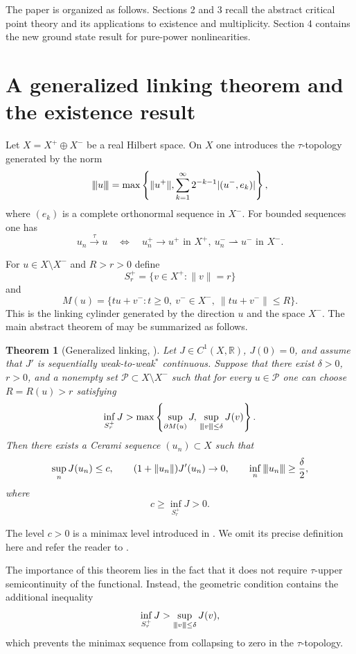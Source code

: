 \documentclass[10pt,a4paper]{amsart}
\numberwithin{equation}{section}
\newtheorem{theorem}{Theorem}[section]
\newcommand{\R}{\mathbb{R}}
\newcommand{\cP}{\mathcal{P}}
\newcommand{\weak}{\rightharpoonup}
\newcommand{\vertiii}[1]{{\left\vert\kern-0.25ex\left\vert\kern-0.25ex\left\vert #1 \right\vert\kern-0.25ex\right\vert\kern-0.25ex\right\vert}}
\begin{document}
The paper is organized as follows. Sections 2 and 3 recall the abstract critical point theory and its applications to existence and multiplicity. Section 4 contains the new ground state result for pure-power nonlinearities.


\section{A generalized linking theorem and the existence result}

Let $X=X^+\oplus X^-$ be a real Hilbert space. On $X$ one introduces the
$\tau$-topology generated by the norm
\[
\vertiii{u}=\max\left\{
\|u^+\|,
\sum_{k=1}^\infty 2^{-k-1}|(u^-,e_k)|
\right\},
\]
where $(e_k)$ is a complete orthonormal sequence in $X^-$. For bounded
sequences one has
\[
u_n\xrightarrow{\tau}u
\quad\Longleftrightarrow\quad
u_n^+\to u^+ \text{ in }X^+,\ u_n^-\weak u^- \text{ in }X^-.
\]

For $u\in X\setminus X^-$ and $R>r>0$ define
\[
S_r^+=\{v\in X^+:\|v\|=r\}
\]
and
\[
M(u)=\{tu+v^-:t\ge0,\ v^-\in X^-,\ \|tu+v^-\|\le R\}.
\]
This is the linking cylinder generated by the direction $u$ and the space $X^-$. The main abstract theorem of \cite{BB2022} may be summarized as follows.

\begin{theorem}[Generalized linking, {\cite[Theorem 2.1]{BB2022}}]
Let $J\in C^1(X,\R)$, $J(0)=0$, and assume that $J'$ is sequentially
weak-to-weak$^*$ continuous. Suppose that there exist $\delta>0$, $r>0$,
and a nonempty set $\cP\subset X\setminus X^-$ such that for every
$u\in\cP$ one can choose $R=R(u)>r$ satisfying
\[
\inf_{S_r^+}J>
\max\left\{
\sup_{\partial M(u)}J,\,
\sup_{\vertiii{v}\le\delta}J(v)
\right\}.
\]
Then there exists a Cerami sequence $(u_n)\subset X$ such that
\[
\sup_n J(u_n)\le c,\qquad
(1+\|u_n\|)J'(u_n)\to0,
\qquad
\inf_n \vertiii{u_n}\ge\frac{\delta}{2},
\]
where
\[
c\ge \inf_{S_r^+}J>0.
\]
\end{theorem}

The level $c>0$ is a minimax level introduced in \cite{BB2022}. We omit its precise definition here and refer the reader to \cite{BB2022}.


The importance of this theorem lies in the fact that it does not require
$\tau$-upper semicontinuity of the functional. Instead, the geometric
condition contains the additional inequality
\[
\inf_{S_r^+}J>\sup_{\vertiii{v}\le\delta}J(v),
\]
which prevents the minimax sequence from collapsing to zero in the
$\tau$-topology.
\end{document}
